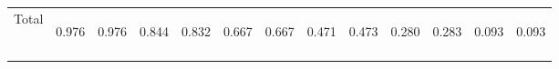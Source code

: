 \begin{center}
\begin{tabular}{lcccccccccccc}
Total & \begin{bf}0.976\end{bf} & \begin{rm}0.976\end{rm} & \begin{bf}0.844\end{bf} & \begin{rm}0.832\end{rm} & \begin{bf}0.667\end{bf} & \begin{rm}0.667\end{rm} & \begin{bf}0.471\end{bf} & \begin{rm}0.473\end{rm} & \begin{bf}0.280\end{bf} & \begin{rm}0.283\end{rm} & \begin{bf}0.093\end{bf} & \begin{rm}0.093\end{rm}\\
\noalign{\smallskip}\hline\end{tabular}\\
\end{center}
